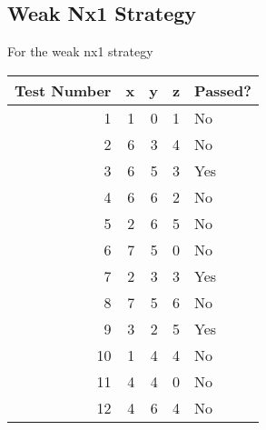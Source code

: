 \documentclass[12pt, letterpaper, titlepage]{article}
\begin{document}
    \subsection*{Weak Nx1 Strategy}
    For the weak nx1 strategy \\
        \begin{tabular}{|r|r|r|r|l|}
        \hline
        \multicolumn{1}{|l|}{Test Number} & \multicolumn{1}{l|}{x} & \multicolumn{1}{l|}{y} & \multicolumn{1}{l|}{z} & Passed? \\ \hline
        1                                 & 1                      & 0                      & 1                      & No      \\ \hline
        2                                 & 6                      & 3                      & 4                      & No      \\ \hline
        3                                 & 6                      & 5                      & 3                      & Yes     \\ \hline
        4                                 & 6                      & 6                      & 2                      & No      \\ \hline
        5                                 & 2                      & 6                      & 5                      & No      \\ \hline
        6                                 & 7                      & 5                      & 0                      & No      \\ \hline
        7                                 & 2                      & 3                      & 3                      & Yes     \\ \hline
        8                                 & 7                      & 5                      & 6                      & No      \\ \hline
        9                                 & 3                      & 2                      & 5                      & Yes     \\ \hline
        10                                & 1                      & 4                      & 4                      & No      \\ \hline
        11                                & 4                      & 4                      & 0                      & No      \\ \hline
        12                                & 4                      & 6                      & 4                      & No      \\ \hline

\end{tabular}
\end{document}
